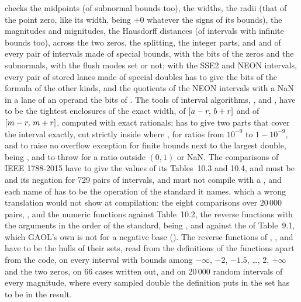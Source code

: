 checks the midpoints (of subnormal bounds too), the
widths, the radii (that of the point zero, like its width, being $+0$ whatever
the signs of its bounds), the magnitudes and mignitudes, the Hausdorff distances
(of intervals with infinite bounds too),  across
the two zeros, the splitting, the integer parts, and  and
 of every pair of intervals made of special bounds, with the
bits of the zeros and the subnormals, with the flush modes set or not; with
the SSE2 and NEON intervals, every pair of stored lanes made of special
doubles has to give the bits of the formula of the other kinds, and the
quotients of the NEON intervals with a NaN in a lane of an operand the bits
of . The tools of interval algorithms,
,  and
, have to be the tightest enclosures of the
exact width, of $[a-r,\,b+r]$ and of $[m-r,\,m+r]$, computed with exact
rationals;  has to give two parts that cover the
interval exactly, cut strictly inside where , for
ratios from $10^{-9}$ to $1-10^{-9}$, and to raise no overflow exception for
finite bounds next to the largest double,  being
, and to throw  for a ratio outside
$(0, 1)$ or NaN.\newinvfive{} The comparisons of IEEE 1788-2015 have to
give the values of its Tables~10.3 and 10.4, \code{==} and \code{!=} must
be  and its negation for 729 pairs of intervals, and must not
compile with a , and each name of  has to be
the operation of the standard it names, which a wrong translation would not
show at compilation: the eight comparisons over 20\,000 pairs, ,
 and the numeric functions against Table~10.2, the reverse
functions with the arguments in the order of the standard,
 being , and 
against the  of Table~9.1, which GAOL's own  is not for
a negative base (). The reverse functions of
, ,  and \newinvfive{} have to be
the hulls of their sets, read from the definitions of the functions apart
from the code, on every interval with bounds among $-\infty$, $-2$, $-1.5$,
\dots, 2, $+\infty$ and the two zeros, on 66 cases written out, and on
20\,000 random intervals of every magnitude, where every sampled double the
definition puts in the set has to be in the result.

